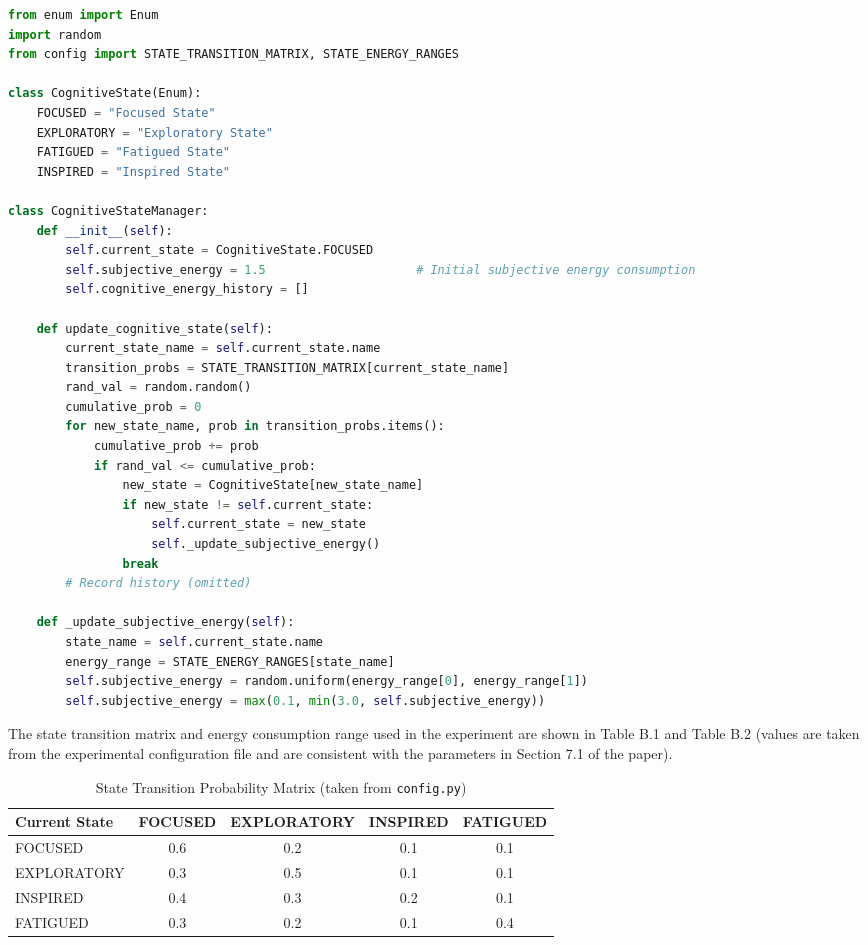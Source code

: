 \documentclass[10pt,onecolumn]{article}
\begin{document}
\begin{lstlisting}[language=Python, caption={Cognitive State Enumeration and Manager (\texttt{cognitive\_states.py})}, label=lst:state_manager, basicstyle=\ttfamily\footnotesize, breaklines=true, breakindent=0pt]
from enum import Enum
import random
from config import STATE_TRANSITION_MATRIX, STATE_ENERGY_RANGES

class CognitiveState(Enum):
    FOCUSED = "Focused State"
    EXPLORATORY = "Exploratory State"
    FATIGUED = "Fatigued State"
    INSPIRED = "Inspired State"

class CognitiveStateManager:
    def __init__(self):
        self.current_state = CognitiveState.FOCUSED
        self.subjective_energy = 1.5                     # Initial subjective energy consumption
        self.cognitive_energy_history = []

    def update_cognitive_state(self):
        current_state_name = self.current_state.name
        transition_probs = STATE_TRANSITION_MATRIX[current_state_name]
        rand_val = random.random()
        cumulative_prob = 0
        for new_state_name, prob in transition_probs.items():
            cumulative_prob += prob
            if rand_val <= cumulative_prob:
                new_state = CognitiveState[new_state_name]
                if new_state != self.current_state:
                    self.current_state = new_state
                    self._update_subjective_energy()
                break
        # Record history (omitted)

    def _update_subjective_energy(self):
        state_name = self.current_state.name
        energy_range = STATE_ENERGY_RANGES[state_name]
        self.subjective_energy = random.uniform(energy_range[0], energy_range[1])
        self.subjective_energy = max(0.1, min(3.0, self.subjective_energy))
\end{lstlisting}

The state transition matrix and energy consumption range used in the experiment are shown in Table B.1 and Table B.2 (values are taken from the experimental configuration file and are consistent with the parameters in Section 7.1 of the paper).

\begin{table}[H]
\footnotesize
\centering
\caption{State Transition Probability Matrix (taken from \texttt{config.py})}
\label{tab:state_transition_app}
\begin{tabular}{lcccc}
\toprule
\textbf{Current State} & \textbf{FOCUSED} & \textbf{EXPLORATORY} & \textbf{INSPIRED} & \textbf{FATIGUED} \\
\midrule
FOCUSED      & 0.6 & 0.2 & 0.1 & 0.1 \\
EXPLORATORY  & 0.3 & 0.5 & 0.1 & 0.1 \\
INSPIRED     & 0.4 & 0.3 & 0.2 & 0.1 \\
FATIGUED     & 0.3 & 0.2 & 0.1 & 0.4 \\
\bottomrule
\end{tabular}
\end{table}
\end{document}
